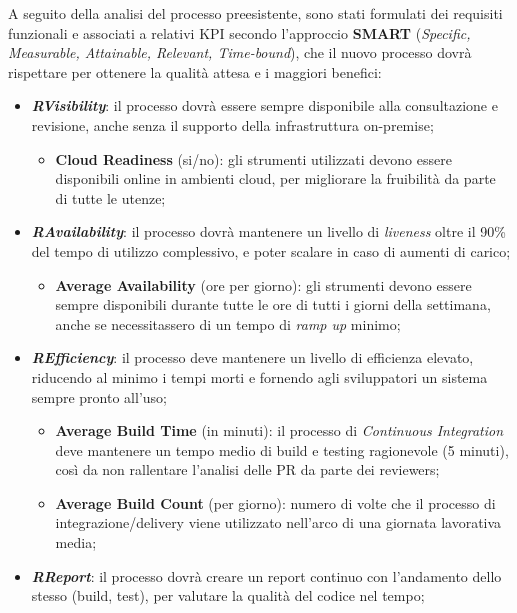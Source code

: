 \documentclass[../main.tex]{subfiles}
\begin{document}
    	    A seguito della analisi del processo preesistente, sono stati formulati dei requisiti funzionali e associati a relativi KPI secondo l'approccio \textbf{SMART} (\emph{Specific, Measurable, Attainable, Relevant, Time-bound}), che il nuovo processo dovrà rispettare per ottenere la qualità attesa e i maggiori benefici:
    	    \begin{itemize}
    	        \item \textbf{\emph{RVisibility}}: il processo dovrà essere sempre disponibile alla consultazione e revisione, anche senza il supporto della infrastruttura on-premise;
                \begin{itemize}
                    \item \textbf{Cloud Readiness} (si/no): gli strumenti utilizzati devono essere disponibili online in ambienti cloud, per migliorare la fruibilità da parte di tutte le utenze;
                \end{itemize}
    	        \item \textbf{\emph{RAvailability}}: il processo dovrà mantenere un livello di \emph{liveness} oltre il 90\% del tempo di utilizzo complessivo, e poter scalare in caso di aumenti di carico;
    	        \begin{itemize}
    	            \item \textbf{Average Availability} (ore per giorno): gli strumenti devono essere sempre disponibili durante tutte le ore di tutti i giorni della settimana, anche se necessitassero di un tempo di \emph{ramp up} minimo;
    	        \end{itemize}
    	        \item \textbf{\emph{REfficiency}}: il processo deve mantenere un livello di efficienza elevato, riducendo al minimo i tempi morti e fornendo agli sviluppatori un sistema sempre pronto all'uso;
    	        \begin{itemize}
    	            \item \textbf{Average Build Time} (in minuti): il processo di \emph{Continuous Integration} deve mantenere un tempo medio di build e testing ragionevole (5 minuti), così da non rallentare l'analisi delle PR da parte dei reviewers;
    	            \item \textbf{Average Build Count} (per giorno): numero di volte che il processo di integrazione/delivery viene utilizzato nell'arco di una giornata lavorativa media;
    	        \end{itemize}
    	        \item \textbf{\emph{RReport}}: il processo dovrà creare un report continuo con l'andamento dello stesso (build, test), per valutare la qualità del codice nel tempo;

\end{itemize}
\end{document}
